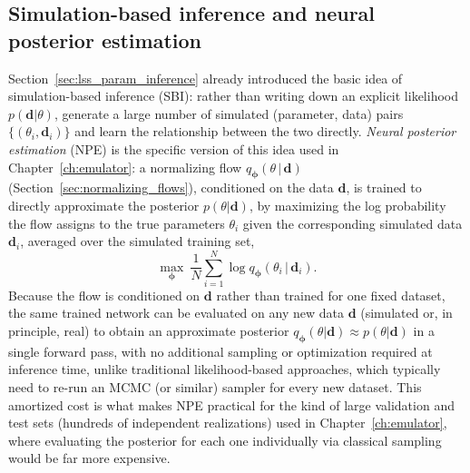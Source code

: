 \subsection{Simulation-based inference and neural posterior estimation}
\label{sec:sbi_npe}

Section~\ref{sec:lss_param_inference} already introduced the basic idea of simulation-based inference (SBI): rather than writing down an explicit likelihood $p(\bm{d}|\theta)$, generate a large number of simulated (parameter, data) pairs $\{(\theta_i, \bm{d}_i)\}$ and learn the relationship between the two directly. \emph{Neural posterior estimation} (NPE) is the specific version of this idea used in Chapter~\ref{ch:emulator}: a normalizing flow $q_{\bm\phi}(\theta\,|\,\bm{d})$ (Section~\ref{sec:normalizing_flows}), conditioned on the data $\bm{d}$, is trained to directly approximate the posterior $p(\theta|\bm{d})$, by maximizing the log probability the flow assigns to the true parameters $\theta_i$ given the corresponding simulated data $\bm{d}_i$, averaged over the simulated training set,
\begin{equation}
    \max_{\bm\phi} \ \frac{1}{N}\sum_{i=1}^{N} \log q_{\bm\phi}(\theta_i\,|\,\bm{d}_i).
\end{equation}
Because the flow is conditioned on $\bm{d}$ rather than trained for one fixed dataset, the same trained network can be evaluated on any new data $\bm{d}$ (simulated or, in principle, real) to obtain an approximate posterior $q_{\bm\phi}(\theta|\bm{d})\approx p(\theta|\bm{d})$ in a single forward pass, with no additional sampling or optimization required at inference time, unlike traditional likelihood-based approaches, which typically need to re-run an MCMC (or similar) sampler for every new dataset. This amortized cost is what makes NPE practical for the kind of large validation and test sets (hundreds of independent realizations) used in Chapter~\ref{ch:emulator}, where evaluating the posterior for each one individually via classical sampling would be far more expensive.

